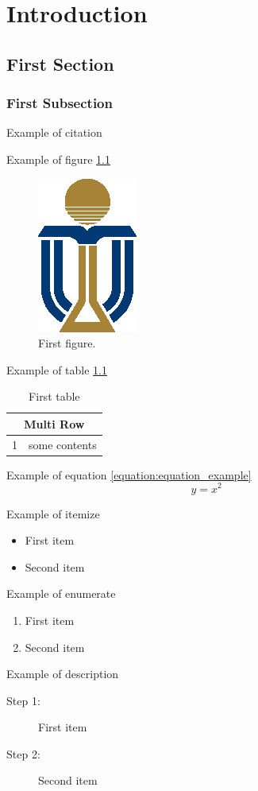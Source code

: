 \chapter{Introduction}
\section{First Section}
\subsection{First Subsection}
Example of citation \cite{Chapman1970}

Example of figure \ref{figure:figure_example}
\begin{figure}[h]
    \centering
    \includegraphics{figures/figures-logo.eps}
    \caption{First figure.}
    \label{figure:figure_example}
\end{figure}

Example of table \ref{table:table_example}
\begin{table}[h]
    \caption{First table}
    \label{table:table_example}
    \centering
    \begin{tabular}{|l|l|}
      \hline
      \multicolumn{2}{|c|}{Multi Row}\\
      \hline
      1 &  some contents\\
      \hline
    \end{tabular}
\end{table}

Example of equation \ref{equation:equation_example}
\begin{equation}
    y=x^2
    \label{equation:equation_example}
\end{equation}

Example of itemize
\begin{itemize}
    \item First item
    \item Second item
\end{itemize}

Example of enumerate
\begin{enumerate}
    \item First item
    \item Second item
\end{enumerate}

Example of description
\begin{description}
    \item[Step 1:] First item
    \item[Step 2:] Second item
\end{description}
